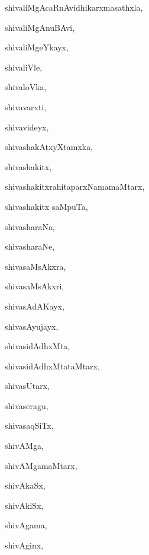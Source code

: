 \begin{multicols}{3}
{\noindent
{shivaliMgAcaRnAvidhikarxmasathxla}, \pageref{shivaliMgAcaRnAvidhikarxmasathxla}

\noindent
{shivaliMgAnuBAvi}, \pageref{shivaliMgAnuBAvi}

\noindent
{shivaliMgeYkayx}, \pageref{shivaliMgeYkayx}

\noindent
{shivaliVle}, \pageref{shivaliVle}

\noindent
{shivaloVka}, \pageref{shivaloVka}

\noindent
{shivavarxti}, \pageref{shivavarxti}

\noindent
{shivavideyx}, \pageref{shivavideyx}

\noindent
{shivashakAtxyXtamxka}, \pageref{shivashakAtxyXtamxka}

\noindent
{shivashakitx}, \pageref{shivashakitx}

\noindent
{shivashakitxrahitaparxNamamaMtarx}, \pageref{shivashakitxrahitaparxNamamaMtarx}

\noindent
{shivashakitx saMpuTa}, \pageref{shivashakitxsaMpuTa}

\noindent
{shivasharaNa}, \pageref{shivasharaNa}

\noindent
{shivasharaNe}, \pageref{shivasharaNe}

\noindent
{shivasaMsAkxra}, \pageref{shivasaMsAkxra}

\noindent
{shivasaMsAkxri}, \pageref{shivasaMsAkxri}

\noindent
{shivasAdAKayx}, \pageref{shivasAdAKayx}

\noindent
{shivasAyujayx}, \pageref{shivasAyujayx}

\noindent
{shivasidAdhxMta}, \pageref{shivasidAdhxMta}

\noindent
{shivasidAdhxMtataMtarx}, \pageref{shivasidAdhxMtataMtarx}

\noindent
{shivasUtarx}, \pageref{shivasUtarx}

\noindent
{shivaseragu}, \pageref{shivaseragu}

\noindent
{shivasaqSiTx}, \pageref{shivasaqSiTx}

\noindent
{shivAMga}, \pageref{shivAMga}

\noindent
{shivAMgamaMtarx}, \pageref{shivAMgamaMtarx}

\noindent
{shivAkaSx}, \pageref{shivAkaSx}

\noindent
{shivAkiSx}, \pageref{shivAkiSx}

\noindent
{shivAgama}, \pageref{shivAgama}

\noindent
{shivAginx}, \pageref{shivAginx}

}
\end{multicols}
